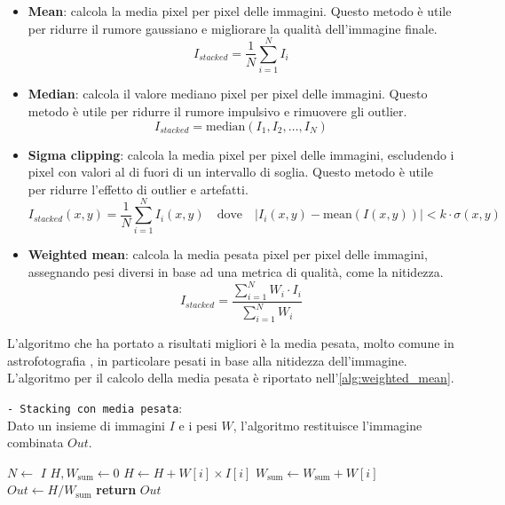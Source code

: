 \begin{itemize}
    \item \textbf{Mean}: calcola la media pixel per pixel delle immagini. Questo metodo è utile per ridurre il rumore gaussiano e migliorare la qualità dell'immagine finale.
    $$
    I_{stacked} = \dfrac{1}{N} \sum_{i=1}^{N} I_i
    $$
    \item \textbf{Median}: calcola il valore mediano pixel per pixel delle immagini. Questo metodo è utile per ridurre il rumore impulsivo e rimuovere gli outlier.
    $$
    I_{stacked} = \text{median}(I_1, I_2, \ldots, I_N)
    $$
    \item \textbf{Sigma clipping}: calcola la media pixel per pixel delle immagini, escludendo i pixel con valori al di fuori di un intervallo di soglia. Questo metodo è utile per ridurre l'effetto di outlier e artefatti.
    $$
    I_{stacked}(x,y) = \dfrac{1}{N} \sum_{i=1}^{N} I_i(x,y) \quad \text{dove} \quad |I_i(x,y) - \text{mean}(I(x,y))| < k \cdot \sigma(x,y)
    $$
    \item \textbf{Weighted mean}: calcola la media pesata pixel per pixel delle immagini, assegnando pesi diversi in base ad una metrica di qualità, come la nitidezza.
    $$
    I_{stacked} = \dfrac{\sum_{i=1}^{N} W_i \cdot I_i}{\sum_{i=1}^{N} W_i}
    $$
\end{itemize}

L'algoritmo che ha portato a risultati migliori è la media pesata, molto comune in astrofotografia \cite{stacking_algos}, in particolare pesati in base alla nitidezza dell'immagine. L'algoritmo per il calcolo della media pesata è riportato nell'\cref{alg:weighted_mean}.

\begin{algorithm}[H]
    \caption{\texttt{- Stacking con media pesata}:\\ Dato un insieme di immagini $I$ e i pesi $W$, l'algoritmo restituisce l'immagine combinata $Out$.} \label{alg:weighted_mean}
    \begin{algorithmic}[1]
            \State $N \gets$  $I$
            \State $H, W_{\text{sum}} \gets 0$
                \State $H \gets H + W[i] \times I[i]$ 
                \State $W_{\text{sum}} \gets W_{\text{sum}} + W[i]$ 
            \EndFor
            \State $Out \gets H / W_{\text{sum}}$ 
            \State \textbf{return} $Out$
        \EndFunction
    \end{algorithmic}
\end{algorithm}


